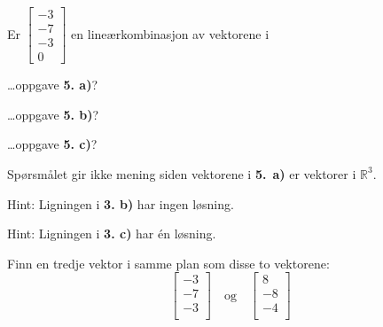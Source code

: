 \begin{oppgave}
	Er 
	$
	\begin{bmatrix}
	-3  \\
	-7 \\
	-3 \\
	0
	\end{bmatrix}
	$
	en lineærkombinasjon av vektorene i 
	
\begin{punkt}
\ldots oppgave \textbf{5. a)}?
\end{punkt} 

\begin{punkt}
	\ldots oppgave \textbf{5. b)}?
\end{punkt} 

\begin{punkt}
	\ldots oppgave \textbf{5. c)}?
\end{punkt} 

\end{oppgave}


\begin{losning}

\begin{punkt}
Spørsmålet gir ikke mening siden vektorene i \textbf{5.}~\textbf{a)} er vektorer i $\mathbb{R}^3$.
\end{punkt}

\begin{punkt}
Hint: Ligningen i \textbf{3. b)} har ingen løsning. 
\end{punkt}


\begin{punkt}
Hint: Ligningen i \textbf{3. c)} har én løsning.
\end{punkt}
	
\end{losning}



\begin{oppgave}
	Finn en tredje vektor i samme plan som disse to vektorene:
\[
	\begin{bmatrix}
	-3  \\
	-7 \\
	-3 \\
	\end{bmatrix}
	\quad\text{og}\quad
	\begin{bmatrix}
	8  \\
	-8 \\
	-4 \\
	\end{bmatrix}
\]
\end{oppgave}

